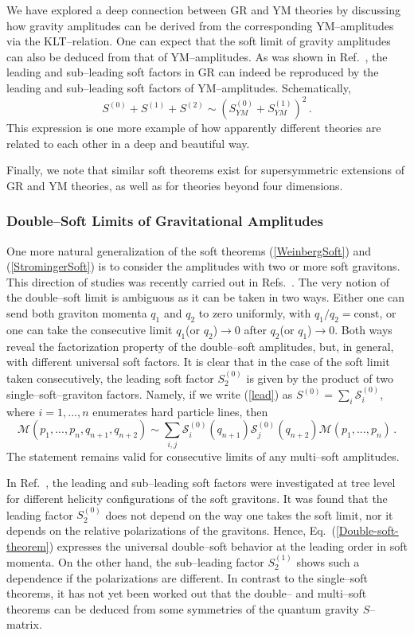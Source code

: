 \documentclass[12pt]{article}
\newcommand{\be}{\begin{equation}}
\newcommand{\ee}{\end{equation}}
\newcommand{\M}{\mathcal{M}}
\begin{document}
We have explored a deep connection between GR and YM theories
by discussing how gravity amplitudes can be derived from the corresponding YM--amplitudes via the KLT--relation.
One can expect that the soft limit of gravity amplitudes can also be deduced from that of YM--amplitudes.
As was shown in Ref.~\cite{Du:2014eca}, the leading and sub--leading soft factors in GR can
indeed be reproduced by the leading and sub--leading soft factors of YM--amplitudes.
Schematically,
\be
S^{(0)}+S^{(1)}+S^{(2)}\sim \left(S^{(0)}_{YM}+S^{(1)}_{YM}\right)^2\,.
\ee
This expression is one more example of how apparently different theories are related to each other in a deep and beautiful way.

Finally, we note that similar soft theorems exist for supersymmetric extensions of GR and YM theories, as well as for theories beyond four dimensions.

\subsubsection{Double--Soft Limits of Gravitational Amplitudes}

One more natural generalization of the soft theorems (\ref{WeinbergSoft}) and (\ref{StromingerSoft}) is to consider the amplitudes with two or more soft gravitons. This direction of studies was recently carried out in Refs.~\cite{Klose:2015xoa,Volovich:2015yoa}. The very notion of the double--soft limit is ambiguous as it can be taken in two ways. Either one can send both graviton momenta $q_1$ and $q_2$ to zero uniformly, with $q_1/q_2=\text{const}$, or one can take the consecutive limit $q_1$(or $q_2$)$\rightarrow 0$ after $q_2$(or $q_1$)$\rightarrow 0$. Both ways reveal the factorization property of the double--soft amplitudes, but, in general, with different universal soft factors. It is clear that in the case of the soft limit taken consecutively, the leading soft factor $S^{(0)}_2$ is given by the product of two single--soft--graviton factors. Namely, if we write (\ref{lead}) as $S^{(0)}=\sum_i \mathcal{S}^{(0)}_i$, where $i=1,...,n$ enumerates hard particle lines, then
\be \label{Double-soft-theorem}
\M(p_1,...,p_n,q_{n+1},q_{n+2})\sim\sum_{i,j}\mathcal{S}^{(0)}_i(q_{n+1})\mathcal{S}^{(0)}_j(q_{n+2})\M(p_1,...,p_n)\,.
\ee
The statement remains valid for consecutive limits of any multi--soft amplitudes.

In Ref.~\cite{Klose:2015xoa}, the leading and sub--leading soft factors were investigated at tree level for different helicity configurations of the soft gravitons.
It was found that the leading factor $S^{(0)}_2$ does not depend on the way one takes the soft limit, nor it depends
on the relative polarizations of the gravitons.
Hence, Eq.~(\ref{Double-soft-theorem}) expresses the universal double--soft behavior at the leading order in soft momenta. On the other hand, the sub--leading factor $S^{(1)}_2$ shows such a dependence if the polarizations are different.
In contrast to the single--soft theorems,
it has not yet been worked out that the double-- and multi--soft theorems
can be deduced from some symmetries of the quantum gravity $S$--matrix.
\end{document}
